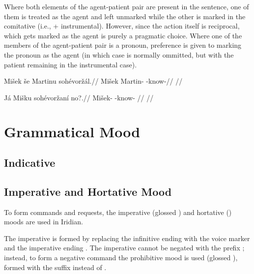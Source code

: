 Where both elements of the agent-patient pair are present in the sentence, one of them is treated as the agent and left unmarked while the other is marked in the comitative (i.e.,  + instrumental). However, since the action itself is reciprocal, which gets marked as the agent is purely a pragmatic choice. Where one of the members of the agent-patient pair is a pronoun, preference is given to marking the pronoun as the agent (in which case  is normally ommitted, but with the patient remaining in the instrumental case).

\pex
\begingl
\gla Mi\v{s}ek \v{s}e Martinu soh\'evor\v{z}\'al.//
\glb Mi\v{s}ek  Martin- -know-//
\glft {}//
\endgl
\xe

\pex
\begingl
\gla J\'a Mi\v{s}ku soh\'evor\v{z}an\'i no?.//
\glb {} Mi\v{s}ek- -know- //
\glft {}//
\endgl
\xe



\section{Grammatical Mood}

\subsection{Indicative}

\subsection{Imperative and Hortative Mood}\label{sec:imp-hort}

To form commands and requests, the imperative (glossed ) and hortative () moods are used in Iridian.

The imperative is formed by replacing the infinitive ending  with the voice marker and the imperative ending . The imperative cannot be negated with the prefix ; instead, to form a negative command the prohibitive mood is used (glossed ), formed with the suffix  instead of .


